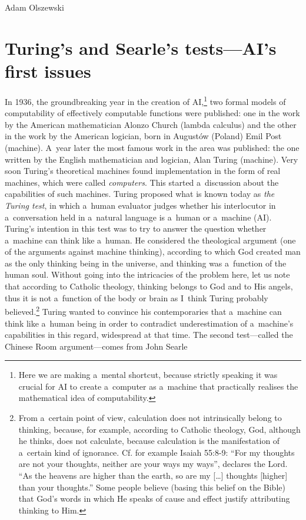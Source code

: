 \begin{artengenv}{Adam Olszewski}
\section{Turing's and Searle's tests—AI's first issues}
In 1936, the groundbreaking year in the creation of AI,\footnote{Here we are making a~mental shortcut, because strictly speaking it was crucial for AI to create a~computer as a~machine that practically realises the mathematical idea of computability.} two formal models of computability of effectively computable functions were published: one in the work by the American mathematician Alonzo Church (lambda calculus) and the other in the work by the American logician, born in Augustów (Poland) Emil Post (machine). A~year later the most famous work in the area was published: the one written by the English mathematician and logician, Alan Turing (machine). Very soon Turing's theoretical machines found implementation in the form of real machines, which were called \textit{computers}. This started a~discussion about the capabilities of such machines. Turing
\parencite*[][]{turing_computing_1950} %
 proposed what is known today as \textit{the Turing test}, in which a~human evaluator judges whether his interlocutor in a~conversation held in a~natural language is a~human or a~machine (AI). Turing's intention in this test was to try to answer the question whether a~machine can think like a~human. He considered the theological argument (one of the arguments against machine thinking), according to which God created man as the only thinking being in the universe, and thinking was a~function of the human soul. Without going into the intricacies of the problem here, let us note that according to Catholic theology, thinking belongs to God and to His angels, thus it is not a~function of the body or brain as I~think Turing probably believed.\footnote{From a~certain point of view, calculation does not intrinsically belong to thinking, because, for example, according to Catholic theology, God, although he thinks, does not calculate, because calculation is the manifestation of a~certain kind of ignorance. Cf. for example Isaiah 55:8-9: ``For my thoughts are not your thoughts, neither are your ways my ways'', declares the Lord. ``As the heavens are higher than the earth, so are my [\ldots] thoughts [higher] than your thoughts.'' Some people believe (basing this belief on the Bible) that God's words in which He speaks of cause and effect justify attributing thinking to Him.} Turing wanted to convince his contemporaries that a~machine can think like a~human being in order to contradict underestimation of a~machine's capabilities in this regard, widespread at that time. The second test—called the Chinese Room argument—comes from John Searle 

\end{artengenv}

